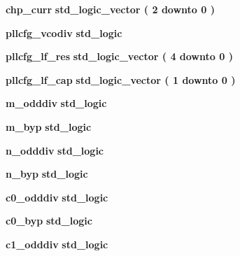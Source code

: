 \begin{DoxyCompactItemize}
\item 
{\bf chp\+\_\+curr} {\bfseries {\bfseries \textcolor{comment}{std\+\_\+logic\+\_\+vector}\textcolor{vhdlchar}{ }\textcolor{vhdlchar}{(}\textcolor{vhdlchar}{ }\textcolor{vhdlchar}{ } \textcolor{vhdldigit}{2} \textcolor{vhdlchar}{ }\textcolor{keywordflow}{downto}\textcolor{vhdlchar}{ }\textcolor{vhdlchar}{ } \textcolor{vhdldigit}{0} \textcolor{vhdlchar}{ }\textcolor{vhdlchar}{)}\textcolor{vhdlchar}{ }}} 
\item 
{\bf pllcfg\+\_\+vcodiv} {\bfseries {\bfseries \textcolor{comment}{std\+\_\+logic}\textcolor{vhdlchar}{ }}} 
\item 
{\bf pllcfg\+\_\+lf\+\_\+res} {\bfseries {\bfseries \textcolor{comment}{std\+\_\+logic\+\_\+vector}\textcolor{vhdlchar}{ }\textcolor{vhdlchar}{(}\textcolor{vhdlchar}{ }\textcolor{vhdlchar}{ } \textcolor{vhdldigit}{4} \textcolor{vhdlchar}{ }\textcolor{keywordflow}{downto}\textcolor{vhdlchar}{ }\textcolor{vhdlchar}{ } \textcolor{vhdldigit}{0} \textcolor{vhdlchar}{ }\textcolor{vhdlchar}{)}\textcolor{vhdlchar}{ }}} 
\item 
{\bf pllcfg\+\_\+lf\+\_\+cap} {\bfseries {\bfseries \textcolor{comment}{std\+\_\+logic\+\_\+vector}\textcolor{vhdlchar}{ }\textcolor{vhdlchar}{(}\textcolor{vhdlchar}{ }\textcolor{vhdlchar}{ } \textcolor{vhdldigit}{1} \textcolor{vhdlchar}{ }\textcolor{keywordflow}{downto}\textcolor{vhdlchar}{ }\textcolor{vhdlchar}{ } \textcolor{vhdldigit}{0} \textcolor{vhdlchar}{ }\textcolor{vhdlchar}{)}\textcolor{vhdlchar}{ }}} 
\item 
{\bf m\+\_\+odddiv} {\bfseries {\bfseries \textcolor{comment}{std\+\_\+logic}\textcolor{vhdlchar}{ }}} 
\item 
{\bf m\+\_\+byp} {\bfseries {\bfseries \textcolor{comment}{std\+\_\+logic}\textcolor{vhdlchar}{ }}} 
\item 
{\bf n\+\_\+odddiv} {\bfseries {\bfseries \textcolor{comment}{std\+\_\+logic}\textcolor{vhdlchar}{ }}} 
\item 
{\bf n\+\_\+byp} {\bfseries {\bfseries \textcolor{comment}{std\+\_\+logic}\textcolor{vhdlchar}{ }}} 
\item 
{\bf c0\+\_\+odddiv} {\bfseries {\bfseries \textcolor{comment}{std\+\_\+logic}\textcolor{vhdlchar}{ }}} 
\item 
{\bf c0\+\_\+byp} {\bfseries {\bfseries \textcolor{comment}{std\+\_\+logic}\textcolor{vhdlchar}{ }}} 
\item 
{\bf c1\+\_\+odddiv} {\bfseries {\bfseries \textcolor{comment}{std\+\_\+logic}\textcolor{vhdlchar}{ }}} 
\item 

\end{DoxyCompactItemize}
